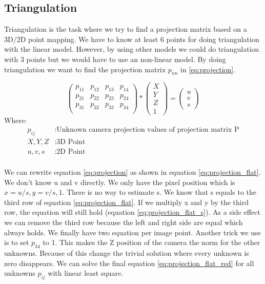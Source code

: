 \documentclass[11pt,a4paper,titlepage,oneside]{report}
\begin{document}
\subsection{Triangulation}\label{sec:triangulation}

Triangulation is the task where we try to find a projection matrix based on a 3D/2D point mapping. We have to know at least 6 points for doing triangulation with the linear model. However, by using other models we could do triangulation with 3 points but we would have to use an non-linear model. By doing triangulation we want to find the projection matrix $p_{nn}$ in \ref{eq:projection}.

\begin{equation}\label{eq:projection}
	\begin{pmatrix}p_{11} & p_{12} & p_{13} & p_{14}\\
		p_{21} & p_{22} & p_{23} & p_{24}\\
		p_{31} & p_{32} & p_{33} & p_{34}\\
	\end{pmatrix}*
	\begin{pmatrix}
		X \\
		Y \\
		Z \\
		1
	\end{pmatrix}=
	\begin{pmatrix}
		u \\
		v \\
		s
  \end{pmatrix}
\end{equation}
Where:
\begin{align*}
	p_{ij}		&: \text{Unknown camera projection values of projection matrix P}\\
	X,Y,Z			&: \text{3D Point}\\
	u,v,s			&: \text{2D Point}\\
\end{align*}

We can rewrite equation \ref{eq:projection} as shown in equation \ref{eq:projection_flat}. We don't know u and v directly. We only have the pixel position which is $x=u/s, y=v/s, 1$. There is no way to estimate s. We know that s equals to the third row of equation \ref{eq:projection_flat}. If we multiply x and y by the third row, the equation will still hold (equation \ref{eq:projection_flat_s}). As a side effect we can remove the third row because the left and right side are equal which always holds. We finally have two equation per image point. Another trick we use is to set $p_{34}$ to 1. This makes the Z position of the camera the norm for the other unknowns. Because of this change the trivial solution where every unknown is zero disappears. We can solve the final equation \ref{eq:projection_flat_red} for all unknowns $p_{ij}$ with linear least square.
\end{document}
